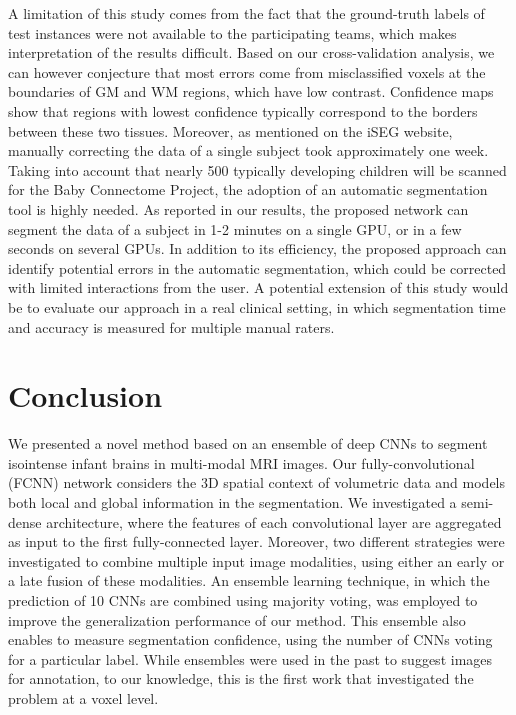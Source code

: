 \documentclass[twoside,espcrc2]{elsarticle}
\begin{document}
A limitation of this study comes from the fact that the ground-truth labels of test instances were not available to the participating teams, which makes interpretation of the results difficult. Based on our cross-validation analysis, we can however conjecture that most errors come from misclassified voxels at the boundaries of GM and WM regions, which have low contrast. Confidence maps show that regions with lowest confidence typically correspond to the borders between these two tissues. Moreover, as mentioned on the iSEG website, manually correcting the data of a single subject took approximately one week. Taking into account that nearly 500 typically developing children will be scanned for the Baby Connectome Project, the adoption of an automatic segmentation tool is highly needed. As reported in our results, the proposed network can segment the data of a subject in 1-2 minutes on a single GPU, or in a few seconds on several GPUs. In addition to its efficiency, the proposed approach can identify potential errors in the automatic segmentation, which could be corrected with limited interactions from the user. A potential extension of this study would be to evaluate our approach in a real clinical setting, in which segmentation time and accuracy is measured for multiple manual raters.





\section{Conclusion}

We presented a novel method based on an ensemble of deep CNNs to segment isointense infant brains in multi-modal MRI images. Our fully-convolutional (FCNN) network considers the 3D spatial context of volumetric data and models both local and global information in the segmentation. We investigated a semi-dense architecture, where the features of each convolutional layer are aggregated as input to the first fully-connected layer. Moreover, two different strategies were investigated to combine multiple input image modalities, using either an early or a late fusion of these modalities. An ensemble learning technique, in which the prediction of 10 CNNs are combined using majority voting, was employed to improve the generalization performance of our method. This ensemble also enables to measure segmentation confidence, using the number of CNNs voting for a particular label. While ensembles  were used in the past to suggest images for annotation, to our knowledge, this is the first work that investigated the problem at a voxel level.
\end{document}

